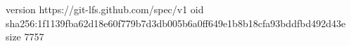 version https://git-lfs.github.com/spec/v1
oid sha256:1f1139fba62d18e60f779b7d3db005b6a0ff649e1b8b18cfa93bddfbd492d43e
size 7757
